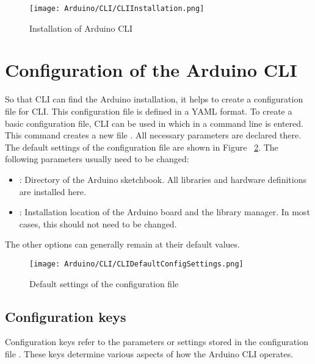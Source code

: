 \begin{figure}
    \begin{center}
        \texttt{[image: Arduino/CLI/CLIInstallation.png]}
        \caption{Installation of Arduino CLI}
        \label{Installation}
    \end{center}
\end{figure}

\section{Configuration of the Arduino CLI}
So that CLI can find the Arduino installation, it helps to create a configuration file for CLI. This configuration file is defined in a YAML format. To create a basic configuration file, CLI can be used in which in a command line
is entered. This command creates a new file . All necessary parameters are declared there. The default settings of the configuration file are shown in Figure ~\ref{DefaultConfig}. The following parameters usually need to be changed:
\begin{itemize}
    \item {}: Directory of the Arduino sketchbook. All libraries and hardware definitions are installed here.
    \item {}: Installation location of the Arduino board and the library manager. In most cases, this should not need to be changed.
\end{itemize}
The other options can generally remain at their default values.
\begin{figure}
    \begin{center}
        \texttt{[image: Arduino/CLI/CLIDefaultConfigSettings.png]}
        \caption{ Default settings of the configuration file }
        \label{DefaultConfig}
    \end{center}
\end{figure}

\subsection{Configuration keys}

Configuration keys refer to the parameters or settings stored in the configuration file . These keys determine various aspects of how the Arduino CLI operates.

